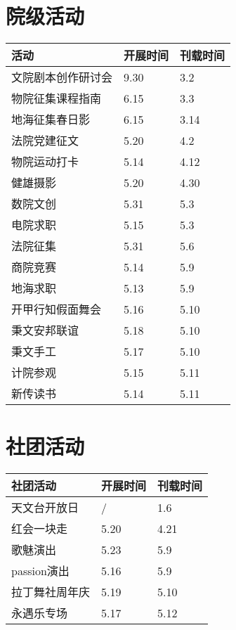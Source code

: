 \documentclass[letterpaper, 12pt]{article}
\begin{document}
\begin{multicols}{2}
\section{院级活动}
\begin{tabular}{|>{\centering\arraybackslash}m{}|m{}|m{}|}
\hline
    活动 & 开展时间 & 刊载时间\\
    \hline\hline
    文院剧本创作研讨会 & 9.30 & 3.2\\
    物院征集课程指南 & 6.15 & 3.3\\
    地海征集春日影 & 6.15 & 3.14\\
    法院党建征文 & 5.20 & 4.2\\
    物院运动打卡 & 5.14 & 4.12\\
    健雄摄影 & 5.20 & 4.30\\
    数院文创 & 5.31 & 5.3\\
    电院求职 & 5.15 & 5.3\\
    法院征集 & 5.31 & 5.6\\
    商院竞赛 & 5.14 & 5.9\\
    地海求职 & 5.13 & 5.9\\
    开甲行知假面舞会 & 5.16 & 5.10\\
    秉文安邦联谊 & 5.18 & 5.10\\
    秉文手工 & 5.17 & 5.10\\
    计院参观 & 5.15 & 5.11\\
    新传读书 & 5.14 & 5.11\\
    \hline
\end{tabular}

\section{社团活动}
\begin{tabular}{|>{\centering\arraybackslash}m{}|m{}|m{}|}
    \hline
    社团活动 & 开展时间 & 刊载时间\\
    \hline\hline
    天文台开放日 & / & 1.6\\
    红会一块走 & 5.20 & 4.21\\
    歌魅演出 & 5.23 & 5.9\\
    passion演出 & 5.16 & 5.9\\
    拉丁舞社周年庆 & 5.19 & 5.10\\
    永遇乐专场 & 5.17 & 5.12\\
    
    \hline
\end{tabular}

\end{multicols}
\end{document}
